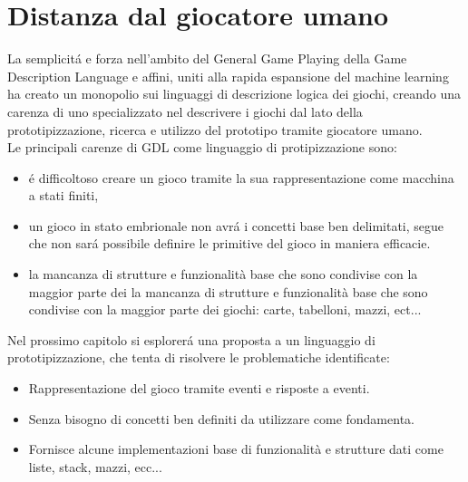 \section{Distanza dal giocatore umano}
La semplicitá e forza nell'ambito del General Game Playing della Game Description Language e affini, 
uniti alla rapida espansione del machine learning ha creato un monopolio sui linguaggi di descrizione
logica dei giochi, creando una carenza di uno specializzato nel descrivere i giochi dal
lato della prototipizzazione, ricerca e utilizzo del prototipo tramite giocatore umano. \\ 
Le principali carenze di GDL come linguaggio di protipizzazione sono:
\begin{itemize}
    \item { 
        é difficoltoso creare un gioco tramite la sua rappresentazione come macchina a stati finiti, 
    }
    \item {
        un gioco in stato embrionale non avrá i concetti base ben delimitati, segue che non sará 
        possibile definire le primitive del gioco in maniera efficacie.
    }
    \item {
        la mancanza di strutture e funzionalità base che sono condivise con la maggior parte dei         la mancanza di strutture e funzionalità base che sono condivise con la maggior parte dei 
        giochi: carte, tabelloni, mazzi, ect...
    }
\end{itemize}
Nel prossimo capitolo si esplorerá una proposta a un linguaggio di prototipizzazione, che 
tenta di risolvere le problematiche identificate:
\begin{itemize}
    \item Rappresentazione del gioco tramite eventi e risposte a eventi.
    \item Senza bisogno di concetti ben definiti da utilizzare come fondamenta.
    \item Fornisce alcune implementazioni base di funzionalità e strutture dati come liste, stack, mazzi, ecc... 
\end{itemize}